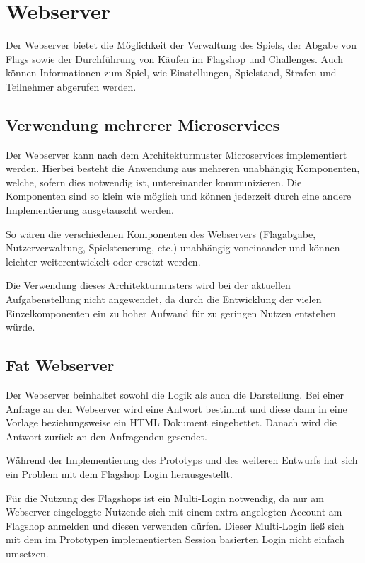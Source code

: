 \section{Webserver} \label{sec:Webserver}
Der Webserver bietet die Möglichkeit der Verwaltung des Spiels, der Abgabe von Flags sowie der Durchführung von Käufen im Flagshop und Challenges. Auch können Informationen zum Spiel, wie Einstellungen, Spielstand, Strafen und Teilnehmer abgerufen werden.

\subsection{Verwendung mehrerer Microservices}
Der Webserver kann nach dem Architekturmuster Microservices implementiert werden. Hierbei besteht die Anwendung aus mehreren unabhängig Komponenten, welche, sofern dies notwendig ist, untereinander kommunizieren. Die Komponenten sind so klein wie möglich und können jederzeit durch eine andere Implementierung ausgetauscht werden. \cite{wolffMicroservicesGrundlagenFlexibler2015} 

So wären die verschiedenen Komponenten des Webservers (Flagabgabe, Nutzerverwaltung, Spielsteuerung, etc.) unabhängig voneinander und können leichter weiterentwickelt oder ersetzt werden.

Die Verwendung dieses Architekturmusters wird bei der aktuellen Aufgabenstellung nicht angewendet, da durch die Entwicklung der vielen Einzelkomponenten ein zu hoher Aufwand für zu geringen Nutzen entstehen würde.

\subsection{Fat Webserver}
Der Webserver beinhaltet sowohl die Logik als auch die Darstellung. Bei einer Anfrage an den Webserver wird eine Antwort bestimmt und diese dann in eine Vorlage beziehungsweise ein HTML Dokument eingebettet. Danach wird die Antwort zurück an den Anfragenden gesendet.

Während der Implementierung des Prototyps und des weiteren Entwurfs hat sich ein Problem mit dem Flagshop Login herausgestellt.

Für die Nutzung des Flagshops ist ein Multi-Login notwendig, da nur am Webserver eingeloggte Nutzende sich mit einem extra angelegten Account am Flagshop anmelden und diesen verwenden dürfen. Dieser Multi-Login ließ sich mit dem im Prototypen implementierten Session basierten Login nicht einfach umsetzen. 

